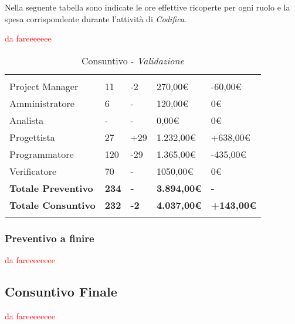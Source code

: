 Nella seguente tabella sono indicate le ore effettive ricoperte per ogni ruolo e la spesa corrispondente durante l'attività di \textit{Codifica}.

\label{sec:tabellaConsuntivoVal}
\textcolor{red}{da fareeeeeee}
\begin{table}[H]
	\centering
	\begin{tabular}{|p{3.8cm}|C{2.6cm}|C{2.9cm}|C{2.7cm}|C{3.3cm}|}
		
		 & & & & \\
		Project Manager & 11 & -2 & 270,00\euro & -60,00\euro \\
		\hline
		Amministratore & 6 & - & 120,00\euro & 0\euro \\
		\hline
		Analista      & - & - & 0,00\euro & 0\euro \\
		\hline
		Progettista   & 27  & +29 & 1.232,00\euro & +638,00\euro \\
		\hline
		Programmatore & 120 & -29 & 1.365,00\euro & -435,00\euro \\
		\hline
		Verificatore  & 70 & - & 1050,00\euro & 0\euro \\
		\textbf{Totale Preventivo} & \textbf{234} & \textbf{-} & \textbf{3.894,00\euro} & \textbf{-}\\
		\textbf{Totale Consuntivo} & \textbf{232} & \textbf{-2} & \textbf{4.037,00\euro} & \textbf{+143,00\euro}\\
	\end{tabular}
	\caption{Consuntivo - \textit{Validazione}}
	
\end{table}

\subsubsection{Preventivo a finire}
\textcolor{red}{da fareeeeeeee}





\subsection{Consuntivo Finale}
\textcolor{red}{da fareeeeeeee}
\label{sec:ConsuntivoFinale}
